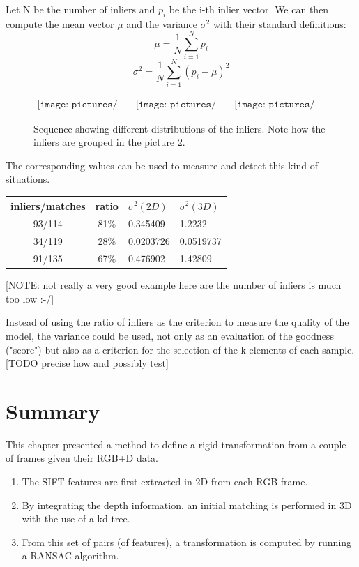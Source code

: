 Let N be the number of inliers and $p_i$ be the i-th inlier vector. We can then compute the mean vector $\mu$ and the variance $\sigma^2$ with their standard definitions:
\[
\mu = \frac{1}{N} \sum_{i=1}^N{p_i}
\]
\[
\sigma^2 = \frac{1}{N} \sum_{i=1}^N{(p_i - \mu)^2}
\]

\begin{figure}[h!]
\centering$
\begin{array}{cccc}
\texttt{[image: pictures/bad\_transform1]} &
\texttt{[image: pictures/bad\_transform2]} &
\texttt{[image: pictures/bad\_transform3]}
\end{array}$
\caption{Sequence showing different distributions of the inliers. Note how the inliers are grouped in the picture 2.}
\end{figure}

The corresponding values can be used to measure and detect this kind of situations.

\begin{tabular}{ccll}
inliers/matches & ratio & $\sigma^2(2D)$ & $\sigma^2(3D)$\\
\hline
93/114 &	81\% &	0.345409 &	1.2232\\
34/119 &	28\% &	0.0203726 &	0.0519737\\
91/135 &	67\% &	0.476902 &	1.42809\\
\end{tabular}

[NOTE: not really a very good example here are the number of inliers is much too low :-/]

Instead of using the ratio of inliers as the criterion to measure the quality of the model, the variance could be used, not only as an evaluation of the goodness ("score") but also as a criterion for the selection of the k elements of each sample. [TODO precise how and possibly test]

\section{Summary}

This chapter presented a method to define a rigid transformation from a couple of frames given their RGB+D data.
\begin{enumerate}
\item The SIFT features are first extracted in 2D from each RGB frame.
\item By integrating the depth information, an initial matching is performed in 3D with the use of a kd-tree.
\item From this set of pairs (of features), a transformation is computed by running a RANSAC algorithm.
\end{enumerate}

